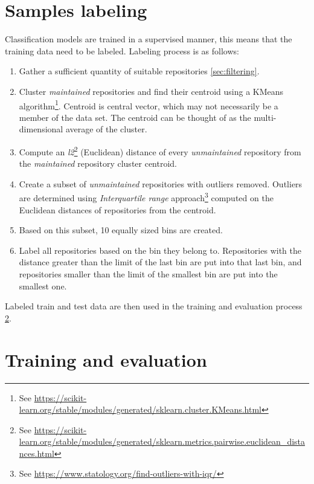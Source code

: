 \section{Samples labeling}
\label{sec:labeling}

Classification models are trained in a supervised manner, this means that the training data need to be labeled.
Labeling process is as follows:

\begin{enumerate}
    \item Gather a sufficient quantity of suitable repositories \ref{sec:filtering}.

    \item Cluster \emph{maintained} repositories and find their centroid using a KMeans algorithm\footnote{See \url{https://scikit-learn.org/stable/modules/generated/sklearn.cluster.KMeans.html}}.
    Centroid is central vector, which may not necessarily be a member of the data set.
    The centroid can be thought of as the multi-dimensional average of the cluster.

    \item Compute an \emph{l2}\footnote{See \url{https://scikit-learn.org/stable/modules/generated/sklearn.metrics.pairwise.euclidean_distances.html}} (Euclidean) distance of every \emph{unmaintained} repository from the \emph{maintained} repository cluster centroid.
    
    \item Create a subset of \emph{unmaintained} repositories with outliers removed.
    Outliers are determined using \emph{Interquartile range} approach\footnote{See \url{https://www.statology.org/find-outliers-with-iqr/}} computed on the Euclidean distances of repositories from the centroid.

    \item Based on this subset, 10 equally sized bins are created.

    \item Label all repositories based on the bin they belong to.
    Repositories with the distance greater than the limit of the last bin are put into that last bin, and repositories smaller than the limit of the smallest bin are put into the smallest one.
\end{enumerate}

Labeled train and test data are then used in the training and evaluation process \ref{sec:training_evaluation}.

\section{Training and evaluation}
\label{sec:training_evaluation}

